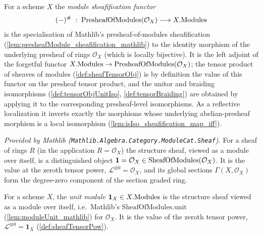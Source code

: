 \begin{definition}
  \label{def:schemeModuleSheafification}
  For a scheme \(X\) the \emph{module sheafification functor}
  \[
    (-)^{\#} \;:\; \mathrm{PresheafOfModules}(\mathcal{O}_X) \longrightarrow X.\mathrm{Modules}
  \]
  is the specialisation of Mathlib's presheaf-of-modules sheafification
  (\cref{lem:presheafModule_sheafification_mathlib}) to the identity morphism of
  the underlying presheaf of rings \(\mathcal{O}_X\) (which is locally bijective).
  It is the left adjoint of the forgetful functor
  \(X.\mathrm{Modules} \to \mathrm{PresheafOfModules}(\mathcal{O}_X)\); the tensor product of sheaves of
  modules (\cref{def:sheafTensorObj}) is by definition the value of this functor
  on the presheaf tensor product, and the unitor and braiding isomorphisms
  (\cref{def:tensorObjUnitIso}, \cref{def:tensorBraiding}) are obtained by
  applying it to the corresponding presheaf-level isomorphisms. As a reflective
  localization it inverts exactly the morphisms whose underlying abelian-presheaf
  morphism is a local isomorphism (\cref{lem:isIso_sheafification_map_iff}).
\end{definition}

\begin{lemma}
  \label{lem:moduleUnit_mathlib}
  \mathlibok
  \textit{Provided by Mathlib
  (\texttt{Mathlib.Algebra.Category.ModuleCat.Sheaf}).}
  For a sheaf of rings \(R\) (in the application \(R = \mathcal{O}_X\)) the
  structure sheaf, viewed as a module over itself, is a distinguished object
  \(\mathbf{1} = \mathcal{O}_X \in \mathrm{SheafOfModules}(\mathcal{O}_X)\). It is the value at
  the zeroth tensor power, \(\mathcal{L}^{\otimes 0} = \mathcal{O}_X\), and its
  global sections \(\Gamma(X, \mathcal{O}_X)\) form the degree-zero component of
  the section graded ring.
\end{lemma}



\begin{definition}
  \label{def:unitModule}
  For a scheme \(X\), the \emph{unit module} \(\mathbf{1}_X \in X.\mathrm{Modules}\) is the
  structure sheaf viewed as a module over itself, i.e.\ Mathlib's
  \(\mathrm{SheafOfModules.unit}\) (\cref{lem:moduleUnit_mathlib}) for
  \(\mathcal{O}_X\). It is the value of the zeroth tensor power,
  \(\mathcal{L}^{\otimes 0} = \mathbf{1}_X\) (\cref{def:sheafTensorPow}).
\end{definition}

